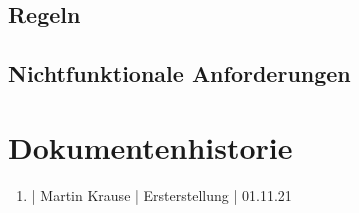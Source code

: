 \documentclass[11pt]{scrartcl}
\begin{document}
\subsection{Regeln}


\subsection{Nichtfunktionale Anforderungen}


\section{Dokumentenhistorie}

\begin{enumerate}
	\item | Martin Krause | Ersterstellung | 01.11.21
\end{enumerate}
 
\end{document}
